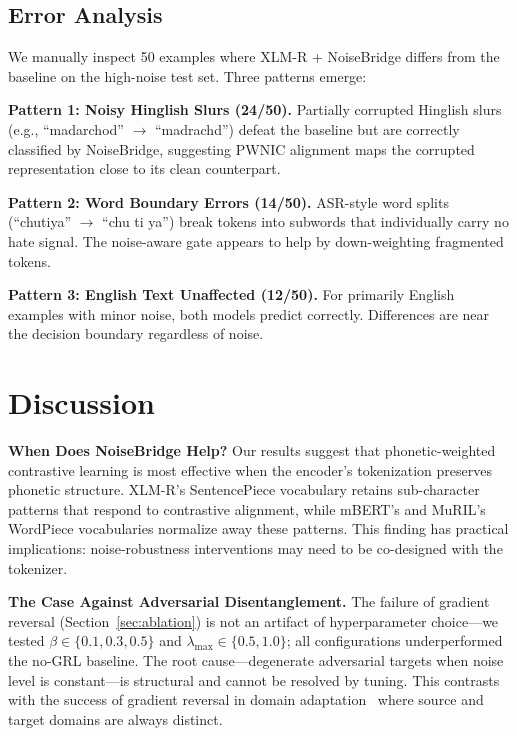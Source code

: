 \documentclass[conference]{IEEEtran}
\begin{document}
\subsection{Error Analysis}

We manually inspect 50 examples where XLM-R + NoiseBridge differs from the baseline on the high-noise test set. Three patterns emerge:

\textbf{Pattern 1: Noisy Hinglish Slurs (24/50).} Partially corrupted Hinglish slurs (e.g., ``madarchod'' $\to$ ``madrachd'') defeat the baseline but are correctly classified by NoiseBridge, suggesting PWNIC alignment maps the corrupted representation close to its clean counterpart.

\textbf{Pattern 2: Word Boundary Errors (14/50).} ASR-style word splits (``chutiya'' $\to$ ``chu ti ya'') break tokens into subwords that individually carry no hate signal. The noise-aware gate appears to help by down-weighting fragmented tokens.

\textbf{Pattern 3: English Text Unaffected (12/50).} For primarily English examples with minor noise, both models predict correctly. Differences are near the decision boundary regardless of noise.


\section{Discussion}
\label{sec:discussion}

\textbf{When Does NoiseBridge Help?} Our results suggest that phonetic-weighted contrastive learning is most effective when the encoder's tokenization preserves phonetic structure. XLM-R's SentencePiece vocabulary retains sub-character patterns that respond to contrastive alignment, while mBERT's and MuRIL's WordPiece vocabularies normalize away these patterns. This finding has practical implications: noise-robustness interventions may need to be co-designed with the tokenizer.

\textbf{The Case Against Adversarial Disentanglement.} The failure of gradient reversal (Section~\ref{sec:ablation}) is not an artifact of hyperparameter choice---we tested $\beta \in \{0.1, 0.3, 0.5\}$ and $\lambda_\text{max} \in \{0.5, 1.0\}$; all configurations underperformed the no-GRL baseline. The root cause---degenerate adversarial targets when noise level is constant---is structural and cannot be resolved by tuning. This contrasts with the success of gradient reversal in domain adaptation~\cite{ganin2016domain} where source and target domains are always distinct.
\end{document}

